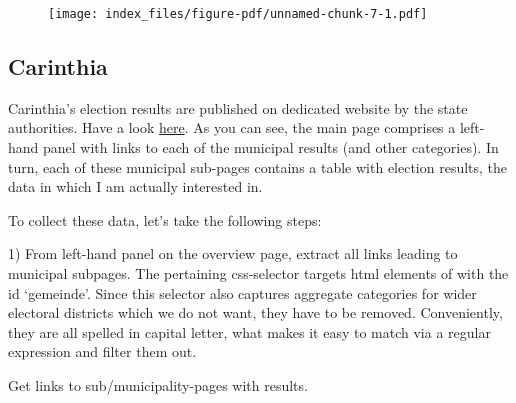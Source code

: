 \documentclass[
  letterpaper,
  DIV=11,
  numbers=noendperiod,
  oneside]{scrartcl}
\begin{document}
\begin{figure}[H]

\texttt{[image: index\_files/figure-pdf/unnamed-chunk-7-1.pdf]} \hfill{}

\end{figure}

\hypertarget{carinthia}{%
\subsection{Carinthia}\label{carinthia}}

Carinthia's election results are published on dedicated website by the
state authorities. Have a look
\href{https://www.ktn.gv.at/wahlen/ltwahl2023\%7Btaget=\%22_blank\%22\%7D}{here}.
As you can see, the main page comprises a left-hand panel with links to
each of the municipal results (and other categories). In turn, each of
these municipal sub-pages contains a table with election results, the
data in which I am actually interested in.

To collect these data, let's take the following steps:

1) From left-hand panel on the overview page, extract all links leading
to municipal subpages. The pertaining css-selector targets html elements
of with the id `gemeinde'. Since this selector also captures aggregate
categories for wider electoral districts which we do not want, they have
to be removed. Conveniently, they are all spelled in capital letter,
what makes it easy to match via a regular expression and filter them
out.

Get links to sub/municipality-pages with results.
\end{document}
